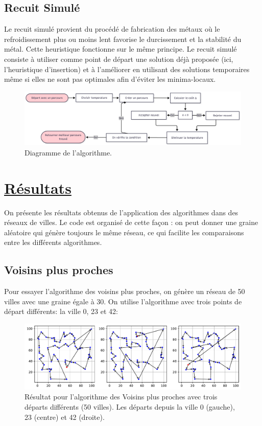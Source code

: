 \documentclass[a4paper,11pt,fleqn]{article}
\begin{document}
\subsection*{Recuit Simulé}
Le recuit simulé \cite{article:recuit}provient du procédé de fabrication des métaux où le refroidissement plus ou moins lent favorise le durcissement et la stabilité du métal. Cette heuristique fonctionne sur le même principe. Le recuit simulé consiste à utiliser comme point de départ une solution déjà proposée (ici, l’heuristique d'insertion) et à l’améliorer en utilisant des solutions temporaires même si elles ne sont pas optimales afin d'éviter les minima-locaux. 

\begin{figure}[H]
    \centering
    \includegraphics[width=\textwidth]{images/charte-recuit.png}
    \caption{Diagramme de l'algorithme.}
    \label{fig:charte-recuit}
\end{figure}

\newpage
\section*{\underline{Résultats}}
On présente les résultats obtenus de l'application des algorithmes dans des réseaux de villes. Le code est organisé de cette façon : on peut donner une graine aléatoire qui génère toujours le même réseau, ce qui facilite les comparaisons entre les différents algorithmes.

\subsection*{Voisins plus proches}
Pour essayer l'algorithme des voisins plus proches, on génère un réseau de 50 villes avec une graine égale à 30. On utilise l'algorithme avec trois points de départ différents: la ville 0, 23 et 42:
\begin{figure}[H]
    \centering
    \includegraphics[width=\textwidth]{images/NN_50_villes_3departs.pdf}
    \caption{Résultat pour l'algorithme des Voisins plus proches avec trois départs différents (50 villes). Les départs depuis la ville 0 (gauche), 23 (centre) et 42 (droite).}
    \label{fig:nn-50}
\end{figure}
\end{document}
